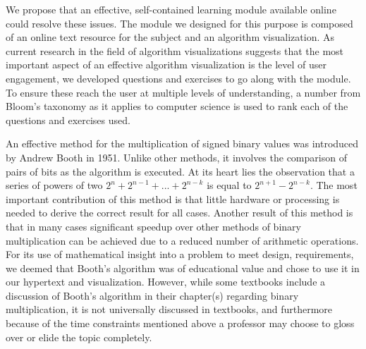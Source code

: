 \documentclass{acm_proc_article-sp}
\begin{document}
We propose that an effective, self-contained learning module available online could resolve these issues.
The module we designed for this purpose is composed of an online text resource for the subject and an algorithm visualization.
As current research in the field of algorithm visualizations suggests that the most important aspect of an effective algorithm visualization is the level of user engagement\cite{ExploringAV}, we developed questions and exercises to go along with the module.
To ensure these reach the user at multiple levels of understanding, a number from Bloom's taxonomy as it applies to computer science is used to rank each of the questions and exercises used.

An effective method for the multiplication of signed binary values was introduced by Andrew Booth in 1951.
Unlike other methods, it involves the comparison of pairs of bits as the algorithm is executed.
At its heart lies the observation that a series of powers of two $2^n + 2^{n-1} + ...
+ 2^{n-k}$ is equal to $2^{n+1} - 2^{n-k}$.
The most important contribution of this method is that little hardware or processing is needed to derive the correct result for all cases\cite{needsCitation}.
Another result of this method is that in many cases significant speedup over other methods of binary multiplication can be achieved due to a reduced number of arithmetic operations.\cite{needsCitation}
For its use of mathematical insight into a problem to meet design, requirements, we deemed that Booth's algorithm was of educational value and chose to use it in our hypertext and visualization.
However, while some textbooks include a discussion of Booth's algorithm in their chapter(s) regarding binary multiplication, it is not universally discussed in textbooks, and furthermore because of the time constraints mentioned above a professor may choose to gloss over or elide the topic completely.

\end{document}
